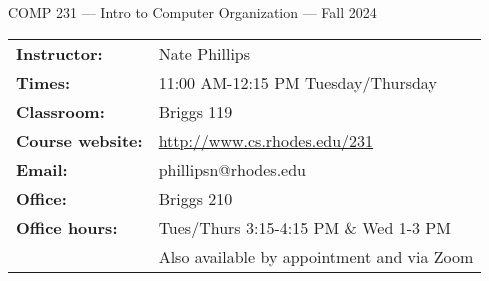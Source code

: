 \documentclass [letterpaper,11pt]{article}
\begin{document}
\begin{center}
\large COMP 231 --- Intro to Computer Organization --- Fall 2024
\end{center}

\noindent\begin{tabular}{@{}ll}
\textbf{Instructor:} & Nate Phillips \\
\textbf{Times:} & 11:00 AM-12:15 PM Tuesday/Thursday\\
\textbf{Classroom:} & Briggs 119 \\
\textbf{Course website:} & \url{http://www.cs.rhodes.edu/231}\\
\textbf{Email:} & phillipsn@rhodes.edu\\
\textbf{Office:} & Briggs 210\\
\textbf{Office hours:} & Tues/Thurs 3:15-4:15 PM \& Wed 1-3 PM \\ &Also available by appointment and via Zoom\\
\end{tabular}
\end{document}
